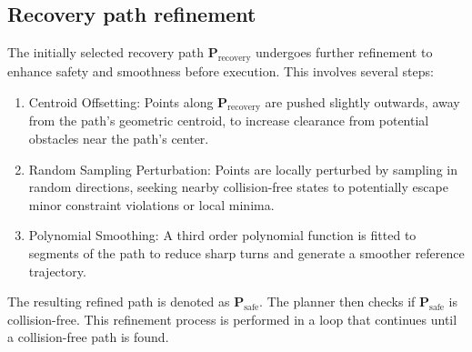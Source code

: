 \subsection{Recovery path refinement}
The initially selected recovery path \( \mathbf{P}_{\text{recovery}} \) undergoes further refinement to enhance safety and smoothness before execution. This involves several steps:
\begin{enumerate}
    \item Centroid Offsetting: Points along \( \mathbf{P}_{\text{recovery}} \) are pushed slightly outwards, away from the path's geometric centroid, to increase clearance from potential obstacles near the path's center.
    \item Random Sampling Perturbation: Points are locally perturbed by sampling in random directions, seeking nearby collision-free states to potentially escape minor constraint violations or local minima.
    \item Polynomial Smoothing: A third order polynomial function is fitted to segments of the path to reduce sharp turns and generate a smoother reference trajectory.
\end{enumerate}
The resulting refined path is denoted as \( \mathbf{P}_{\text{safe}} \). The planner then checks if \( \mathbf{P}_{\text{safe}} \) is collision-free. This refinement process is performed in a loop that continues until a collision-free path is found.




























